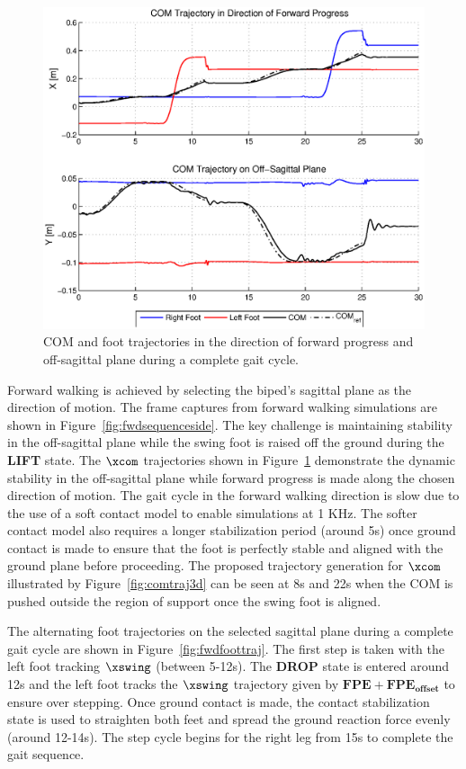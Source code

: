\begin{figure}[!b]
	\centering
    \includegraphics[scale=0.7]{fig/simulations/fwdcomtraj.eps}
  	\caption{COM and foot trajectories in the direction of forward progress and off-sagittal plane during a complete gait cycle.}
	\label{fig:fwdcomtraj}
\end{figure}

Forward walking is achieved by selecting the biped's sagittal plane as the direction of motion. The frame captures from forward walking simulations are shown in Figure~\ref{fig:fwdsequenceside}. The key challenge is maintaining stability in the off-sagittal plane while the swing foot is raised off the ground during the \textbf{LIFT} state. The $\xcom$ trajectories shown in Figure~\ref{fig:fwdcomtraj} demonstrate the dynamic stability in the off-sagittal plane while forward progress is made along the chosen direction of motion. The gait cycle in the forward walking direction is slow due to the use of a soft contact model to enable simulations at 1 KHz. The softer contact model also requires a longer stabilization period (around 5s) once ground contact is made to ensure that the foot is perfectly stable and aligned with the ground plane before proceeding. The proposed trajectory generation for $\xcom$ illustrated by Figure~\ref{fig:comtraj3d} can be seen at 8s and 22s when the COM is pushed outside the region of support once the swing foot is aligned. 

The alternating foot trajectories on the selected sagittal plane during a complete gait cycle are shown in Figure~\ref{fig:fwdfoottraj}. The first step is taken with the left foot tracking $\xswing$ (between 5-12s). The \textbf{DROP} state is entered around 12s and the left foot tracks the $\xswing$ trajectory given by $\mathbf{FPE} + \mathbf{FPE_{offset}}$ to ensure over stepping. Once ground contact is made, the contact stabilization state is used to straighten both feet and spread the ground reaction force evenly (around 12-14s). The step cycle begins for the right leg from 15s to complete the gait sequence. 

